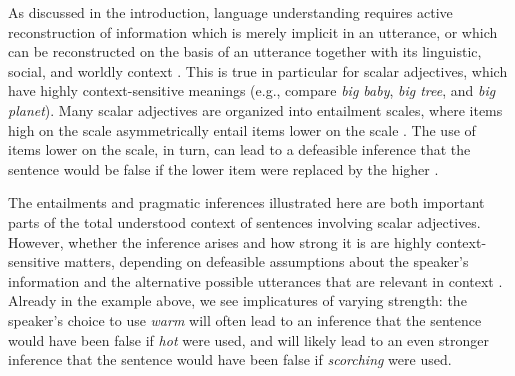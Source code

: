 \documentclass[10pt]{article}
\begin{document}
As discussed in the introduction, language understanding requires active reconstruction of information which is merely implicit in an utterance, or which can be reconstructed on the basis of an utterance together with its linguistic, social, and worldly context \cite{grice1975logic,hobbs1993interpretation,clark1996using,hanna2003effects,piantadosi2012communicative}.
This is true in particular for scalar adjectives, which have highly context-sensitive meanings (e.g., compare \emph{big baby}, \emph{big tree}, and \emph{big planet}). Many scalar adjectives are organized into entailment scales, where items high on the scale asymmetrically entail items lower on the scale \cite{horn89,horn2000pick}. The use of items lower on the scale, in turn, can lead to a defeasible inference that the sentence would be false if the lower item were replaced by the higher \cite{grice1975logic,horn89}.
 \vspace{-.05in} 

 \vspace{-.05in}
The entailments and pragmatic inferences illustrated here are both important parts of the total understood context of sentences involving scalar adjectives. However, whether the inference arises and how strong it is are highly context-sensitive matters, depending on defeasible assumptions about the speaker's information and the alternative possible utterances that are relevant in context \cite{hirschberg1991theory,frank2012predicting,goodman2013knowledge}. Already in the example above, we see implicatures of varying strength: the speaker's choice to use \emph{warm} will often lead to an inference that the sentence would have been false if \emph{hot} were used, and will likely lead to an even stronger inference that the sentence would have been false if \emph{scorching} were used. 
\end{document}
